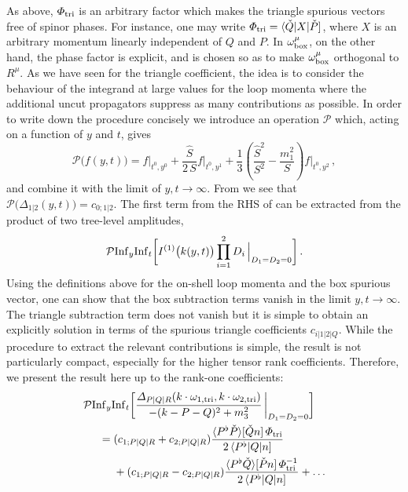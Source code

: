 As above, $\Phi_{\rm tri}$ is an arbitrary factor which makes the triangle spurious vectors free of spinor phases. For instance, one may write $\Phi_{\rm tri}=\spAB{\check{Q}}{X}{\check{P}}$, where $X$ is an arbitrary momentum linearly independent of $Q$ and $P$. In $\omega_{\rm box}^{\mu}$, on the other hand, the phase factor is explicit, and is chosen so as to make $\omega_{\rm box}^{\mu}$ orthogonal to $R^{\mu}$.
As we have seen for the triangle coefficient, the idea is to consider the
behaviour of the integrand at large values for the loop momenta where the
additional uncut propagators suppress as many contributions as possible. In
order to write down the procedure concisely we introduce an operation
$\mathcal{P}$ which, acting on a function of $y$ and $t$, gives
\begin{equation} \label{eq:Pdef}
  \mathcal{P}\bigl(f(y,t) \bigr) = f \bigl|_{t^0,y^0} + \frac{\hat{S}}{2 \, S}f \bigl|_{t^0,y^1}+ \frac{1}{3}\left( \frac{\hat{S}^2}{S^2} - \frac{m_1^2}{S} \right)f\bigl|_{t^0,y^2} \,,
\end{equation}
and combine it with the limit of $y,t\to \infty$. From  we see that
$\mathcal{P}\bigl(\Delta_{1|2}(y,t) \bigr) = c_{0;1|2}$. The first term from the RHS of  can be extracted from the product of
two tree-level amplitudes,
\begin{align}
  \mathcal{P} {\rm Inf}_y {\rm Inf}_t \bigg[ I^{(1)}\bigl(k(y,t) \bigr) \prod_{i=1}^2 D_i \, \Bigl|_{D_1=D_2=0} \bigg] \,.
\end{align}
Using the definitions above for the on-shell loop momenta and the box spurious
vector, one can show that the box subtraction terms vanish in the limit $y,t\to
\infty$. The triangle subtraction term does not vanish but it is simple to
obtain an explicitly solution in terms of the spurious triangle coefficients
$c_{i|1|2|Q}$. While the procedure to extract the relevant contributions is
simple, the result is not particularly compact, especially for the higher
tensor rank coefficients. Therefore, we present the result here up to the
rank-one coefficients:
\begin{align}
\begin{aligned}
  & \mathcal{P} {\rm Inf}_y {\rm Inf}_t \bigg[ \frac{\Delta_{P|Q|R}(k\cdot\omega_{1,{\rm tri}}, k\cdot\omega_{2,{\rm tri}})}{-(k-P-Q)^2+m_3^2} \, \biggl|_{D_1=D_2=0} \bigg] \\
  & \hspace{0.5cm} =  ( c_{1;P|Q|R} + c_{2;P|Q|R} ) \frac{\spA{P^\flat}{\check{P}} \spB{\check{Q}}{n} \, \Phi_{\rm tri} }{2 \, \spAB{P^{\flat}}{Q}{n} } \\
  & \hspace{0.5cm} \phantom{{} = {}} + ( c_{1;P|Q|R} - c_{2;P|Q|R} ) \frac{ \spA{P^\flat}{\check{Q}} \spB{\check{P}}{n} \, \Phi_{\rm tri}^{-1} }{ 2 \, \spAB{P^{\flat}}{Q}{n} } + \ldots
\end{aligned}
\end{align}
